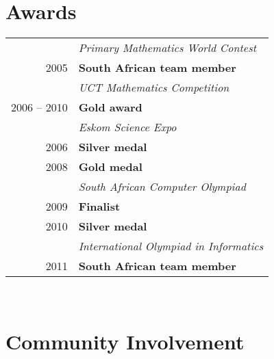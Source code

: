 \documentclass[a4paper,10pt]{article} %
\begin{document}
\hfill
\begin{minipage}[t]{0.44\textwidth} 
\vspace{0pt} %



\section{Awards} 

\begin{tabular}{rl}
& \textit{Primary Mathematics World Contest}\\
2005 & \textbf{South African team member}\\[5pt]

& \textit{UCT Mathematics Competition}\\
2006 -- 2010 & \textbf{Gold award}\\[5pt]

& \textit{Eskom Science Expo}\\
2006 & \textbf{Silver medal}\\
2008 & \textbf{Gold medal}\\[5pt]

& \textit{South African Computer Olympiad}\\
2009 & \textbf{Finalist}\\
2010 & \textbf{Silver medal}\\[5pt]

& \textit{International Olympiad in Informatics}\\
2011 & \textbf{South African team member}
\end{tabular}\\[10pt]



\section{Community Involvement}


\end{minipage}
\end{document}
